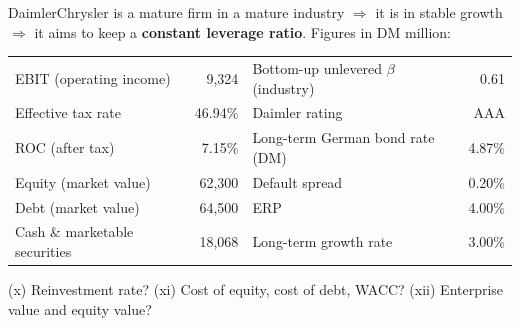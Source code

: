 \begin{exbox}
DaimlerChrysler is a mature firm in a mature industry $\Rightarrow$ it is in stable growth $\Rightarrow$ it aims to keep a \textbf{constant leverage ratio}. Figures in DM million:
\begin{center}
\begin{tabular}{@{}lr@{\hspace{1cm}}lr@{}}
EBIT (operating income) & 9,324 & Bottom-up unlevered $\beta$ (industry) & 0.61\\
Effective tax rate & 46.94\% & Daimler rating & AAA\\
ROC (after tax) & 7.15\% & Long-term German bond rate (DM) & 4.87\%\\
Equity (market value) & 62,300 & Default spread & 0.20\%\\
Debt (market value) & 64,500 & ERP & 4.00\%\\
Cash \& marketable securities & 18,068 & Long-term growth rate & 3.00\%\\
\end{tabular}
\end{center}
(x) Reinvestment rate? (xi) Cost of equity, cost of debt, WACC? (xii) Enterprise value and equity value?
\end{exbox}
